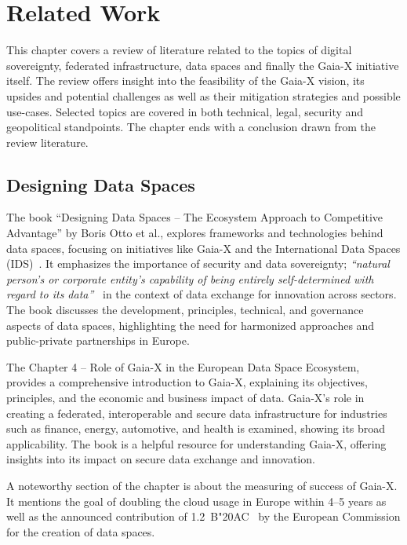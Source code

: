 \chapter{Related Work}\label{ch:related-work}

\begin{chapterabstract}
    This chapter covers a review of literature related to the topics of digital sovereignty, federated infrastructure, data spaces and finally the Gaia-X initiative itself.
    The review offers insight into the feasibility of the Gaia-X vision, its upsides and potential challenges as well as their mitigation strategies and possible use-cases.
    Selected topics are covered in both technical, legal, security and geopolitical standpoints.
    The chapter ends with a conclusion drawn from the review literature.
\end{chapterabstract}

\section{Designing Data Spaces}\label{sec:designing-data-spaces}

The book ``Designing Data Spaces -- The Ecosystem Approach to Competitive Advantage'' by Boris Otto et al., explores frameworks and technologies behind data spaces, focusing on initiatives like Gaia-X and the International Data Spaces (IDS)~\cite{designing_dataspaces}.
It emphasizes the importance of security and data sovereignty; \textit{``natural person’s or corporate entity’s capability of being entirely self-determined with regard to its data''}~\cite{designing_dataspaces} in the context of data exchange for innovation across sectors.
The book discusses the development, principles, technical, and governance aspects of data spaces, highlighting the need for harmonized approaches and public-private partnerships in Europe.

The Chapter 4 -- Role of Gaia-X in the European Data Space Ecosystem, provides a comprehensive introduction to Gaia-X, explaining its objectives, principles, and the economic and business impact of data.
Gaia-X's role in creating a federated, interoperable and secure data infrastructure for industries such as finance, energy, automotive, and health is examined, showing its broad applicability.
The book is a helpful resource for understanding Gaia-X, offering insights into its impact on secure data exchange and innovation.

A noteworthy section of the chapter is about the measuring of success of Gaia-X.
It mentions the goal of doubling the cloud usage in Europe within 4--5 years as well as the announced contribution of 1.2~B\char"20AC~ by the European Commission for the creation of data spaces. %

